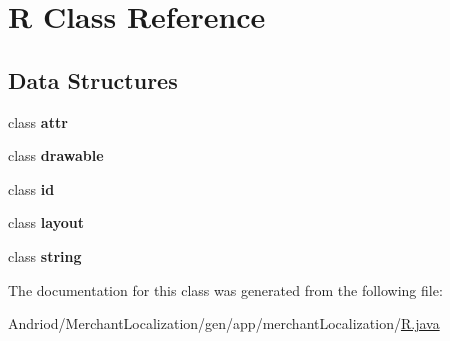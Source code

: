 \hypertarget{classapp_1_1merchant_localization_1_1_r}{\section{R Class Reference}
\label{classapp_1_1merchant_localization_1_1_r}
}
\subsection*{Data Structures}
\begin{DoxyCompactItemize}
\item 
class {\bfseries attr}
\item 
class {\bfseries drawable}
\item 
class {\bfseries id}
\item 
class {\bfseries layout}
\item 
class {\bfseries string}
\end{DoxyCompactItemize}


The documentation for this class was generated from the following file\-:\begin{DoxyCompactItemize}
\item 
Andriod/\-Merchant\-Localization/gen/app/merchant\-Localization/\hyperlink{_merchant_localization_2gen_2app_2merchant_localization_2_r_8java}{R.\-java}\end{DoxyCompactItemize}
